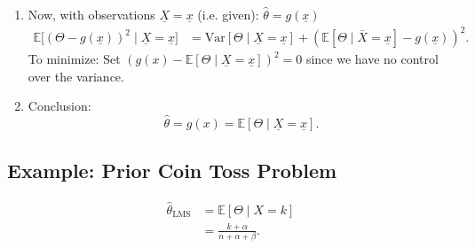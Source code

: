 \begin{notes}
\begin{enumerate}
\begin{enumerate}
        \item Now, with observations \( \underline{X} = \underline{x} \) (i.e. given): $\hat{\theta} = g(\underline{x})$
        \begin{align*}
            \mathbb{E}\big[(\Theta - g(\underline{x}))^2 \mid \underline{X} = \underline{x}\big] &= \mathrm{Var}[\Theta \mid \underline{X} = \underline{x}] + (\mathbb{E}[\Theta \mid \bar{X} = \underline{x}] - g(\underline{x}))^2.
        \end{align*}
        To minimize: Set \( (g(x) - \mathbb{E}[\Theta \mid \underline{X} = \underline{x}])^2 = 0 \) since we have no control over the variance.
        \item Conclusion:
        \[
        \hat{\theta} = g(x) = \mathbb{E}[\Theta \mid \underline{X} = \underline{x}].
        \]
    \end{enumerate}
    \end{enumerate}
\end{notes}

\subsection{Example: Prior Coin Toss Problem}
\begin{example}
    
    \begin{align*}
        \hat{\theta}_{\text{LMS}} &= \mathbb{E}[\Theta \mid X = k] \\
        &= \frac{k + \alpha}{n + \alpha + \beta}.
    \end{align*}
\end{example}

